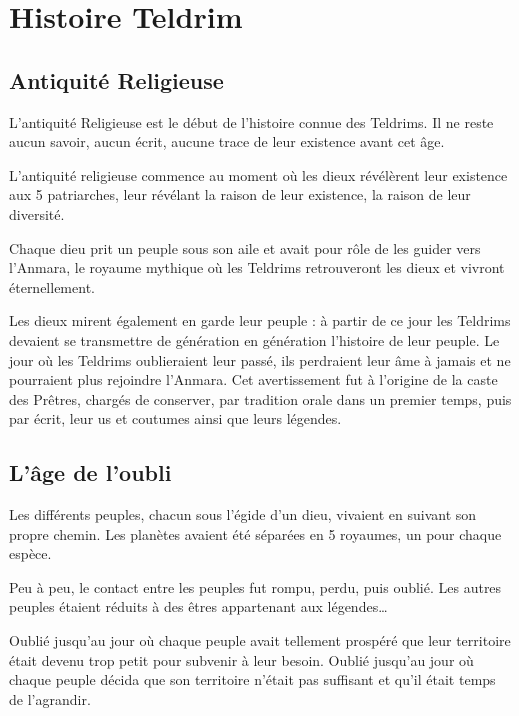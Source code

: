 \chapter{Histoire Teldrim}

\begin{multicols}{2}

\section{Antiquité Religieuse}

L’antiquité Religieuse est le début de l’histoire connue des Teldrims. Il ne reste aucun savoir, aucun écrit, aucune trace de leur existence avant cet âge.

L’antiquité religieuse commence au moment où les dieux révélèrent leur existence aux 5 patriarches, leur révélant la raison de leur existence, la raison de leur diversité.

Chaque dieu prit un peuple sous son aile et avait pour rôle de les guider vers l’Anmara, le royaume mythique où les Teldrims retrouveront les dieux et vivront éternellement. 

Les dieux mirent également en garde leur peuple : à partir de ce jour les Teldrims devaient se transmettre de génération en génération l’histoire de leur peuple. Le jour où les Teldrims oublieraient leur passé, ils perdraient leur âme à jamais et ne pourraient plus rejoindre l’Anmara. Cet avertissement fut à l’origine de la caste des Prêtres, chargés de conserver, par tradition orale dans un premier temps, puis par écrit, leur us et coutumes ainsi que leurs légendes.

\section{L’âge de l’oubli}

Les différents peuples, chacun sous l’égide d’un dieu, vivaient en suivant son propre chemin. Les planètes avaient été séparées en 5 royaumes, un pour chaque espèce.

Peu à peu, le contact entre les peuples fut rompu, perdu, puis oublié. Les autres peuples étaient réduits à des êtres appartenant aux légendes… 

Oublié jusqu’au jour où chaque peuple avait tellement prospéré que leur territoire était devenu trop petit pour subvenir à leur besoin. Oublié jusqu’au jour où chaque peuple décida que son territoire n’était pas suffisant et qu’il était temps de l’agrandir.


\end{multicols}
